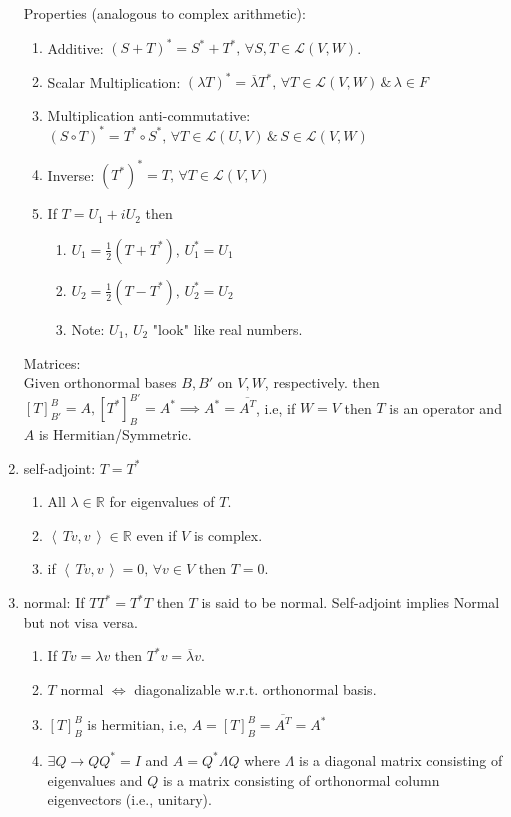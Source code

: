 \documentclass[11pt]{amsart}
\theoremstyle{definition}  %
\newcommand{\R}{\mathbb{R}}
\newcommand{\IP}[1]{\left \langle\, #1 \,\right \rangle}
\newcommand{\LL}{\mathcal{L}}
\begin{document}
\begin{enumerate}
	Properties (analogous to complex arithmetic):
	\begin{enumerate}[label=\roman*)]
		\item Additive: $(S+T)^*=S^*+T^*,\, \forall S,T \in \LL(V,W)$.
		\item Scalar Multiplication: $(\lambda T)^* = \overline{\lambda}T^*,\, \forall T \in \LL(V,W) \,\&\, \lambda \in F$
		\item Multiplication anti-commutative: $(S \circ T)^* = T^*\circ S^*,\, \forall T \in \LL(U,V) \, \& \, S \in \LL(V,W)$
		\item Inverse: $(T^*)^*=T, \, \forall T \in \LL(V,V)$
		\item If $T=U_1+iU_2$ then 
		\begin{enumerate}[label=\alph*)]
			\item $U_1=\frac{1}{2}(T+T^*), \,U_1^*=U_1$
			\item $U_2=\frac{1}{2}(T-T^*), \,U_2^*=U_2$
			\item Note: $U_1,\, U_2$ "look" like real numbers.
		\end{enumerate}
	\end{enumerate}
	Matrices: \\
	Given orthonormal bases $B, B'$ on $V, W$, respectively. then $[T]_{B'}^B = A, [T^*]_B^{B'}=A^* \implies A^*= \overline{A^T}$, i.e, if $W=V$ then $T$ is an operator and $A$ is Hermitian/Symmetric.
	\item self-adjoint: $T=T^*$
	\begin{enumerate}[label=\alph*)]
		\item All $\lambda \in \R$ for eigenvalues of $T$.
		\item $\IP{Tv,v} \in \R$ even if $V$ is complex.
		\item if $\IP{Tv,v}=0,\,\forall v \in V$ then $T=0$.
	\end{enumerate}
	\item normal: If $TT^*=T^*T$ then $T$ is said to be normal.  Self-adjoint implies Normal but not visa versa.
	\begin{enumerate}[label=\alph*)]
		\item If $Tv=\lambda v$ then $T^*v= \overline{\lambda}v$.
		\item $T$ normal $\iff$ diagonalizable w.r.t. orthonormal basis.
		\item $[T]_B^B$ is hermitian, i.e, $A=[T]_B^B =\overline{A^T}=A^*$
		\item $\exists Q \to QQ^*=I$ and $A=Q^*\Lambda Q$ where $\Lambda$ is a diagonal matrix consisting of eigenvalues and $Q$ is a matrix consisting of orthonormal column eigenvectors (i.e., unitary).

\end{enumerate}
\end{enumerate}
\end{document}
